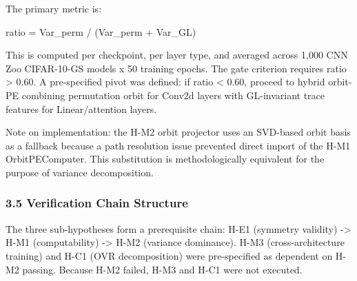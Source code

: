 The primary metric is:

    ratio = Var_perm / (Var_perm + Var_GL)

This is computed per checkpoint, per layer type, and averaged across 1,000 CNN Zoo CIFAR-10-GS models x 50 training epochs. The gate criterion requires ratio > 0.60. A pre-specified pivot was defined: if ratio < 0.60, proceed to hybrid orbit-PE combining permutation orbit for Conv2d layers with GL-invariant trace features for Linear/attention layers.

Note on implementation: the H-M2 orbit projector uses an SVD-based orbit basis as a fallback because a path resolution issue prevented direct import of the H-M1 OrbitPEComputer. This substitution is methodologically equivalent for the purpose of variance decomposition.

\subsubsection{3.5 Verification Chain Structure}

The three sub-hypotheses form a prerequisite chain: H-E1 (symmetry validity) -> H-M1 (computability) -> H-M2 (variance dominance). H-M3 (cross-architecture training) and H-C1 (OVR decomposition) were pre-specified as dependent on H-M2 passing. Because H-M2 failed, H-M3 and H-C1 were not executed.


